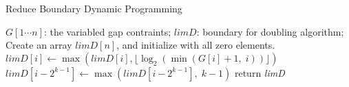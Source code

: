 \begin{algorithm*}[!thb]
  \caption{Reduce Boundary Dynamic Programming}
  \label{alg:reduce-boundary}
  \begin{algorithmic}[1]
  \Require
      $G[1 \cdots n]$: the variabled gap contraints;
  \Ensure
      $\textit{limD}$: boundary for doubling algorithm;
  \State Create an array $\textit{limD}[n]$, and initialize with all zero elements.
    \State $\textit{limD}[i] \gets \max(\textit{limD}[i], \lfloor \log_2(\min(G[i]+1, \; i)) \rfloor)$
      \State $\textit{limD}[i-2^{k-1}] \gets \max(\textit{limD}[i-2^{k-1}], \; k-1)$
    \EndFor
  \EndFor
  \State return \textit{limD}
  \end{algorithmic}
\end{algorithm*}